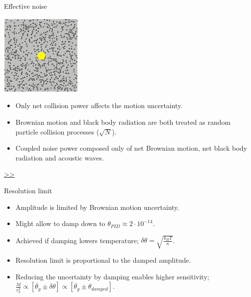 \documentclass{beamer}
\begin{document}
\begin{frame}{\hypertarget{frame:Effective noise}{Effective noise}}
	\begin{center}		
		\includegraphics[width=0.3\textwidth,keepaspectratio]{random_motion1.jpg}
	\end{center}


	\begin{itemize}	
		
		\item Only net collision power affects the motion uncertainty.
		\item Brownian motion and black body radiation are both treated as random particle collision processes ($\sqrt{N}$).
		\item Coupled noise power composed only of net Brownian motion, net black body radiation and acoustic waves.  	 
					
	\end{itemize}
	\hyperlink{frame:Effective noise 1}{>>} 

\end{frame}


\begin{frame}{Resolution limit}
	
	\begin{itemize}	 
		\item Amplitude is limited by Brownian motion uncertainty.
		\item Might allow to damp down to $\theta_{PID}\approx 2\cdot 10^{-14}$.
		\item Achieved if damping lowers temperature; $\delta\theta = \sqrt{\frac{k_B T}{\kappa}}$.
		\item Resolution limit is proportional to the damped amplitude. 	
		\item Reducing the uncertainty by damping enables higher sensitivity; $\frac{M}{r_0^3} \propto [\overline{\theta}_g\pm \delta\theta] \propto [\overline{\theta}_g\pm \theta_{damped}]$.			
				
	\end{itemize}
\end{frame}
\end{document}
